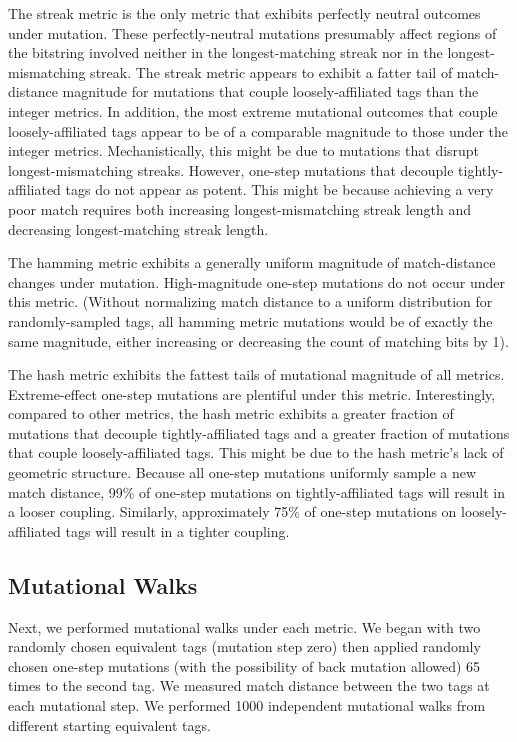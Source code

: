 The streak metric is the only metric that exhibits perfectly neutral outcomes under mutation.
These perfectly-neutral mutations presumably affect regions of the bitstring involved neither in the longest-matching streak nor in the longest-mismatching streak.
The streak metric appears to exhibit a fatter tail of match-distance magnitude for mutations that couple loosely-affiliated tags than the integer metrics.
In addition, the most extreme mutational outcomes that couple loosely-affiliated tags appear to be of a comparable magnitude to those under the integer metrics.
Mechanistically, this might be due to mutations that disrupt longest-mismatching streaks.
However, one-step mutations that decouple tightly-affiliated tags do not appear as potent.
This might be because achieving a very poor match requires both increasing longest-mismatching streak length and decreasing longest-matching streak length.

The hamming metric exhibits a generally uniform magnitude of match-distance changes under mutation.
High-magnitude one-step mutations do not occur under this metric.
(Without normalizing match distance to a uniform distribution for randomly-sampled tags, all hamming metric mutations would be of exactly the same magnitude, either increasing or decreasing the count of matching bits by 1).

The hash metric exhibits the fattest tails of mutational magnitude of all metrics.
Extreme-effect one-step mutations are plentiful under this metric.
Interestingly, compared to other metrics, the hash metric exhibits a greater fraction of mutations that decouple tightly-affiliated tags and a greater fraction of mutations that couple loosely-affiliated tags.
This might be due to the hash metric's lack of geometric structure.
Because all one-step mutations uniformly sample a new match distance, 99\% of one-step mutations on tightly-affiliated tags will result in a looser coupling.
Similarly, approximately 75\% of one-step mutations on loosely-affiliated tags will result in a tighter coupling.

\subsection{Mutational Walks}




Next, we performed mutational walks under each metric.
We began with two randomly chosen equivalent tags (mutation step zero) then applied randomly chosen one-step mutations (with the possibility of back mutation allowed) 65 times to the second tag.
We measured match distance between the two tags at each mutational step.
We performed 1000 independent mutational walks from different starting equivalent tags.

